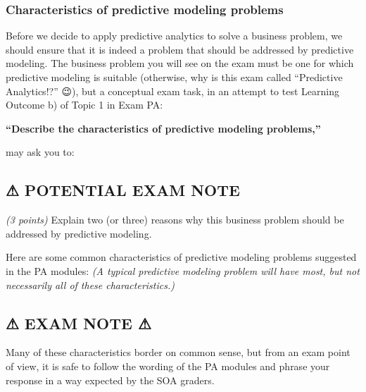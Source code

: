\documentclass[
  12pt,
]{krantz}
\begin{document}
\subsubsection{Characteristics of predictive modeling problems}\label{characteristics-of-predictive-modeling-problems}

Before we decide to apply predictive analytics to solve a business problem, we
should ensure that it is indeed a problem that should be addressed by predictive
modeling. The business problem you will see on the exam must be one for which
predictive modeling is suitable (otherwise, why is this exam called ``Predictive
Analytics!?'' 😉), but a conceptual exam task, in an attempt to test Learning
Outcome b) of Topic 1 in Exam PA:

\textbf{``Describe the characteristics of predictive modeling problems,''}

may ask you to:

\subsection*{⚠ POTENTIAL EXAM NOTE}\label{potential-exam-note}


\emph{(3 points)} Explain two (or three) reasons why this business problem should be
addressed by predictive modeling.

Here are some common characteristics of predictive modeling problems suggested
in the PA modules: \emph{(A typical predictive modeling problem will have most, but
not necessarily all of these characteristics.)}

\subsection*{⚠ EXAM NOTE ⚠}\label{exam-note-1}


Many of these characteristics border on common sense, but from an exam point of
view, it is safe to follow the wording of the PA modules and phrase your
response in a way expected by the SOA graders.
\end{document}
